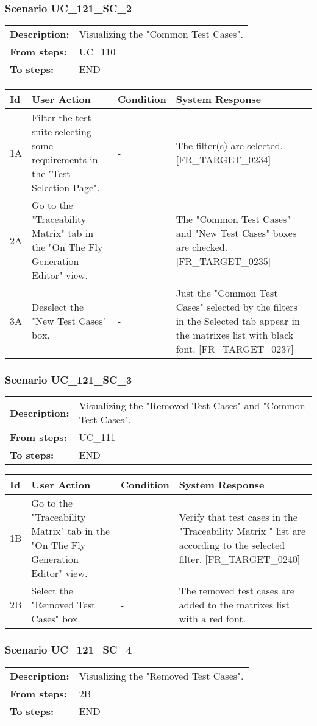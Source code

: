 \documentclass[a4paper,11pt]{article}
\newcommand{\bl}{\\ \hline}
\begin{document}
\subsubsection*{Scenario UC_121_SC_2}
\begin{tabular}{p{1in}p{4in}}
{\bf Description:} & Visualizing the "Common Test Cases". \\
{\bf From steps:} & UC_110#2M \\
{\bf To steps:} & END \\
\end{tabular}
 
\begin{tabular}{|p{0.8in}|p{1.6in}|p{1.6in}|p{1.6in}|}
\hline
Id & User Action & Condition & System Response  \bl 
1A & Filter the test suite selecting some requirements in the "Test Selection Page". & - & The filter(s) are selected. [FR_TARGET_0234] \bl 
2A & Go to the "Traceability Matrix" tab in the "On The Fly Generation Editor" view. & - & The "Common Test Cases" and "New Test Cases" boxes are checked. [FR_TARGET_0235] \bl 
3A & Deselect the "New Test Cases" box. & - & Just the "Common Test Cases" selected by the filters in the Selected tab appear in the matrixes list with black font. [FR_TARGET_0237] \bl 
\end{tabular}
\subsubsection*{Scenario UC_121_SC_3}
\begin{tabular}{p{1in}p{4in}}
{\bf Description:} & Visualizing the "Removed Test Cases" and "Common Test Cases". \\
{\bf From steps:} & UC_111#1M \\
{\bf To steps:} & END \\
\end{tabular}
 
\begin{tabular}{|p{0.8in}|p{1.6in}|p{1.6in}|p{1.6in}|}
\hline
Id & User Action & Condition & System Response  \bl 
1B & Go to the "Traceability Matrix" tab in the "On The Fly Generation Editor" view. & - & Verify that test cases in the "Traceability Matrix " list are according to the selected filter. [FR_TARGET_0240] \bl 
2B & Select the "Removed Test Cases" box. & - & The removed test cases are added to the matrixes list with a red font. \bl 
\end{tabular}
\subsubsection*{Scenario UC_121_SC_4}
\begin{tabular}{p{1in}p{4in}}
{\bf Description:} & Visualizing the "Removed Test Cases". \\
{\bf From steps:} & 2B \\
{\bf To steps:} & END \\
\end{tabular}
 
\end{document}

